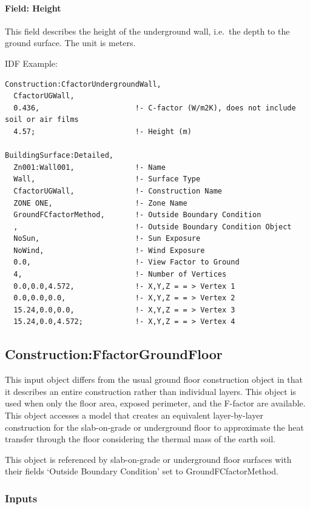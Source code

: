 \paragraph{Field: Height}\label{field-height}

This field describes the height of the underground wall, i.e.~the depth to the ground surface. The unit is meters.

IDF Example:

\begin{lstlisting}
Construction:CfactorUndergroundWall,
  CfactorUGWall,
  0.436,                      !- C-factor (W/m2K), does not include soil or air films
  4.57;                       !- Height (m)

BuildingSurface:Detailed,
  Zn001:Wall001,              !- Name
  Wall,                       !- Surface Type
  CfactorUGWall,              !- Construction Name
  ZONE ONE,                   !- Zone Name
  GroundFCfactorMethod,       !- Outside Boundary Condition
  ,                           !- Outside Boundary Condition Object
  NoSun,                      !- Sun Exposure
  NoWind,                     !- Wind Exposure
  0.0,                        !- View Factor to Ground
  4,                          !- Number of Vertices
  0.0,0.0,4.572,              !- X,Y,Z = = > Vertex 1
  0.0,0.0,0.0,                !- X,Y,Z = = > Vertex 2
  15.24,0.0,0.0,              !- X,Y,Z = = > Vertex 3
  15.24,0.0,4.572;            !- X,Y,Z = = > Vertex 4
\end{lstlisting}

\subsection{Construction:FfactorGroundFloor}\label{constructionffactorgroundfloor}

This input object differs from the usual ground floor construction object in that it describes an entire construction rather than individual layers. This object is used when only the floor area, exposed perimeter, and the F-factor are available.~ This object accesses a model that creates an equivalent layer-by-layer construction for the slab-on-grade or underground floor to approximate the heat transfer through the floor considering the thermal mass of the earth soil.

This object is referenced by slab-on-grade or underground floor surfaces with their fields `Outside Boundary Condition' set to GroundFCfactorMethod.

\subsubsection{Inputs}\label{inputs-37}

